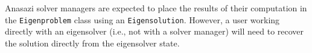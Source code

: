 \documentclass[acmtoms]{acmtrans2m}
\newcommand{\aspace}[1]{\texttt{#1}}
\begin{document}
Anasazi solver managers are expected to place the results of their computation in the
\aspace{Eigenproblem} class using an \aspace{Eigensolution}. However, a user working
directly with an eigensolver (i.e., not with a solver manager) will need to recover the
solution directly from the eigensolver state.



\end{document}
